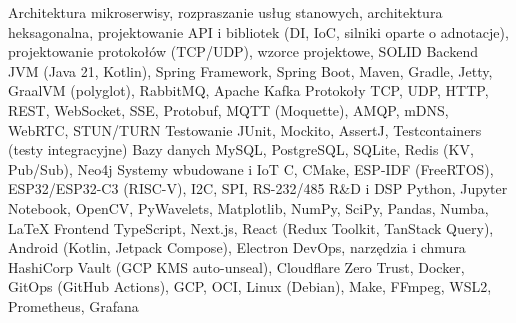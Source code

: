 
\newcommand{\TextRodo}{%
  Wyrażam zgodę na przetwarzanie moich danych osobowych dla potrzeb niezbędnych do realizacji procesu rekrutacji
  (zgodnie z ustawą z dnia 10 maja 2018 roku o ochronie danych osobowych (Dz. U. z 2018, poz. 1000) oraz zgodnie z
  Rozporządzeniem Parlamentu Europejskiego i Rady (UE) 2016/679 z dnia 27 kwietnia 2016 r. w sprawie ochrony osób
  fizycznych w związku z przetwarzaniem danych osobowych i w sprawie swobodnego przepływu takich danych oraz uchylenia
  dyrektywy 95/46/WE (RODO).
}


\newcommand{\SkillsTitle}{Technologie i umiejętności}
\renewcommand{\SkillsList}{}
\AddSkillEntry
  {Architektura}
  {%
    mikroserwisy, rozpraszanie usług stanowych, architektura heksagonalna, projektowanie API i bibliotek (DI, IoC,
    silniki oparte o adnotacje), projektowanie protokołów (TCP/UDP), wzorce projektowe, SOLID
  }
\AddSkillEntry
  {Backend}
  {%
    JVM (Java 21, Kotlin), Spring Framework, Spring Boot, Maven, Gradle, Jetty, GraalVM (polyglot), RabbitMQ, Apache
    Kafka
  }
\AddSkillEntry
  {Protokoły}
  {TCP, UDP, HTTP, REST, WebSocket, SSE, Protobuf, MQTT (Moquette), AMQP, mDNS, WebRTC, STUN/TURN}
\AddSkillEntry
  {Testowanie}
  {JUnit, Mockito, AssertJ, Testcontainers (testy integracyjne)}
\AddSkillEntry
  {Bazy danych}
  {MySQL, PostgreSQL, SQLite, Redis (KV, Pub/Sub), Neo4j}
\AddSkillEntry
  {Systemy wbudowane i IoT}
  {C, CMake, ESP-IDF (FreeRTOS), ESP32/ESP32-C3 (RISC-V), I2C, SPI, RS-232/485}
\AddSkillEntry
  {R\&D i DSP}
  {Python, Jupyter Notebook, OpenCV, PyWavelets, Matplotlib, NumPy, SciPy, Pandas, Numba, \LaTeX}
\AddSkillEntry
  {Frontend}
  {TypeScript, Next.js, React (Redux Toolkit, TanStack Query), Android (Kotlin, Jetpack Compose), Electron}
\AddSkillEntry
  {DevOps, narzędzia i chmura}
  {%
    HashiCorp Vault (GCP KMS auto-unseal), Cloudflare Zero Trust, Docker, GitOps (GitHub Actions), GCP, OCI, Linux
    (Debian), Make, FFmpeg, WSL2, Prometheus, Grafana
  }
